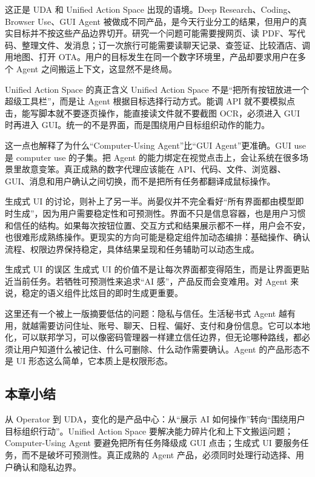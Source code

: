 \documentclass[a4paper]{article}
\begin{document}
这正是 UDA 和 Unified Action Space 出现的语境。Deep Research、Coding、Browser Use、GUI Agent 被做成不同产品，是今天行业分工的结果，但用户的真实目标并不按这些产品边界切开。研究一个问题可能需要搜网页、读 PDF、写代码、整理文件、发消息；订一次旅行可能需要读聊天记录、查签证、比较酒店、调用地图、打开 OTA。用户的目标发生在同一个数字环境里，产品却要求用户在多个 Agent 之间搬运上下文，这显然不是终局。

\begin{importantbox}{Unified Action Space 的真正含义}
Unified Action Space 不是“把所有按钮放进一个超级工具栏”，而是让 Agent 根据目标选择行动方式。能调 API 就不要模拟点击，能写脚本就不要逐页操作，能直接读文件就不要截图 OCR，必须进入 GUI 时再进入 GUI。统一的不是界面，而是围绕用户目标组织动作的能力。
\end{importantbox}

这一点也解释了为什么“Computer-Using Agent”比“GUI Agent”更准确。GUI use 是 computer use 的子集。把 Agent 的能力绑定在视觉点击上，会让系统在很多场景里故意变笨。真正成熟的数字代理应该能在 API、代码、文件、浏览器、GUI、消息和用户确认之间切换，而不是把所有任务都翻译成鼠标操作。

生成式 UI 的讨论，则补上了另一半。尚晏仪并不完全看好“所有界面都由模型即时生成”，因为用户需要稳定性和可预测性。界面不只是信息容器，也是用户习惯和信任的结构。如果每次按钮位置、交互方式和结果展示都不一样，用户会不安，也很难形成熟练操作。更现实的方向可能是稳定组件加动态编排：基础操作、确认流程、权限边界保持稳定，具体结果呈现和任务辅助可以动态生成。

\begin{warningbox}{生成式 UI 的误区}
生成式 UI 的价值不是让每次界面都变得陌生，而是让界面更贴近当前任务。若牺牲可预测性来追求“AI 感”，产品反而会变难用。对 Agent 来说，稳定的语义组件比炫目的即时生成更重要。
\end{warningbox}

这里还有一个被上一版摘要低估的问题：隐私与信任。生活秘书式 Agent 越有用，就越需要访问住址、账号、聊天、日程、偏好、支付和身份信息。它可以本地化，可以联邦学习，可以像密码管理器一样建立信任边界，但无论哪种路线，都必须让用户知道什么被记住、什么可删除、什么动作需要确认。Agent 的产品形态不是 UI 形态这么简单，它本质上是权限形态。

\subsection{本章小结}

从 Operator 到 UDA，变化的是产品中心：从“展示 AI 如何操作”转向“围绕用户目标组织行动”。Unified Action Space 要解决能力碎片化和上下文搬运问题；Computer-Using Agent 要避免把所有任务降级成 GUI 点击；生成式 UI 要服务任务，而不是破坏可预测性。真正成熟的 Agent 产品，必须同时处理行动选择、用户确认和隐私边界。
\end{document}
